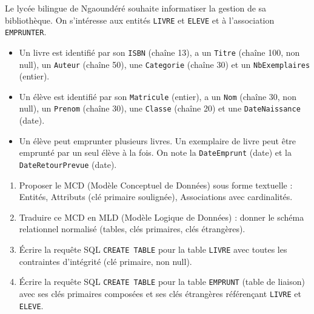 \documentclass[11pt]{article}
\newcounter{popsec}
\newcounter{popsub}
\newcommand{\courssub}[1]{%
  \stepcounter{popsub}%
  \par\vspace{9pt}\noindent{\popxbold\fontsize{11.5}{13}\selectfont\color{popink}{\color{poporange}\thepopsec.\thepopsub}\hspace{6pt}#1}\par\nopagebreak\vspace{4pt}
}
\begin{document}
\courssub{Je me prépare au Bac}

\begin{exercice}
Le lycée bilingue de Ngaoundéré souhaite informatiser la gestion de sa bibliothèque. On s'intéresse aux entités \texttt{LIVRE} et \texttt{ELEVE} et à l'association \texttt{EMPRUNTER}.
\begin{itemize}
    \item Un livre est identifié par son \texttt{ISBN} (chaîne 13), a un \texttt{Titre} (chaîne 100, non null), un \texttt{Auteur} (chaîne 50), une \texttt{Categorie} (chaîne 30) et un \texttt{NbExemplaires} (entier).
    \item Un élève est identifié par son \texttt{Matricule} (entier), a un \texttt{Nom} (chaîne 30, non null), un \texttt{Prenom} (chaîne 30), une \texttt{Classe} (chaîne 20) et une \texttt{DateNaissance} (date).
    \item Un élève peut emprunter plusieurs livres. Un exemplaire de livre peut être emprunté par un seul élève à la fois. On note la \texttt{DateEmprunt} (date) et la \texttt{DateRetourPrevue} (date).
\end{itemize}
\begin{enumerate}
    \item Proposer le MCD (Modèle Conceptuel de Données) sous forme textuelle : Entités, Attributs (clé primaire soulignée), Associations avec cardinalités.
    \item Traduire ce MCD en MLD (Modèle Logique de Données) : donner le schéma relationnel normalisé (tables, clés primaires, clés étrangères).
    \item Écrire la requête SQL \texttt{CREATE TABLE} pour la table \texttt{LIVRE} avec toutes les contraintes d'intégrité (clé primaire, non null).
    \item Écrire la requête SQL \texttt{CREATE TABLE} pour la table \texttt{EMPRUNT} (table de liaison) avec ses clés primaires composées et ses clés étrangères référençant \texttt{LIVRE} et \texttt{ELEVE}.
\end{enumerate}
\end{exercice}
\end{document}
